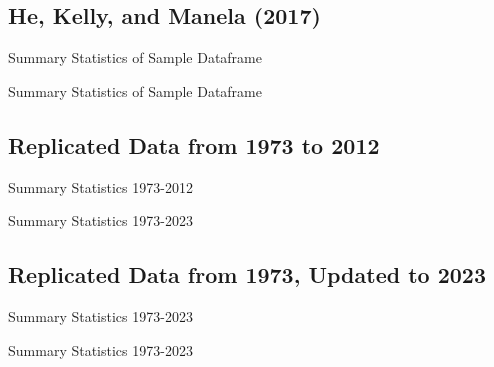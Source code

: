 \documentclass{article}
\begin{document}
\subsection{He, Kelly, and Manela (2017)}
\begin{table}[h] 
\centering 
   \caption{Summary Statistics of Sample Dataframe}
   
\end{table}

\begin{table}[h] 
\centering 
   \caption{Summary Statistics of Sample Dataframe}
   
\end{table}


\subsection{Replicated Data from 1973 to 2012}
\begin{table}[h] 
\centering 
   \caption{Summary Statistics 1973-2012}
   
\end{table}
\clearpage  %
\begin{table}[h]
\centering 
   \caption{Summary Statistics 1973-2023}
   
\end{table}


\subsection{Replicated Data from 1973, Updated to 2023 }
\begin{table}[h]
\centering
   \caption{Summary Statistics 1973-2023}
   
\end{table}
\begin{table}[h]
\centering
   \caption{Summary Statistics 1973-2023}
   
\end{table}
\end{document}
